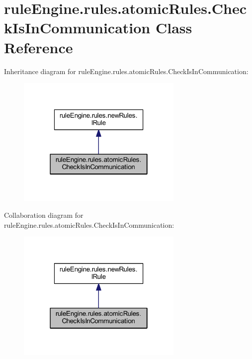 \hypertarget{classrule_engine_1_1rules_1_1atomic_rules_1_1_check_is_in_communication}{}\section{rule\+Engine.\+rules.\+atomic\+Rules.\+Check\+Is\+In\+Communication Class Reference}
\label{classrule_engine_1_1rules_1_1atomic_rules_1_1_check_is_in_communication}


Inheritance diagram for rule\+Engine.\+rules.\+atomic\+Rules.\+Check\+Is\+In\+Communication\+:
\nopagebreak
\begin{figure}[H]
\begin{center}
\leavevmode
\includegraphics[width=226pt]{classrule_engine_1_1rules_1_1atomic_rules_1_1_check_is_in_communication__inherit__graph}
\end{center}
\end{figure}


Collaboration diagram for rule\+Engine.\+rules.\+atomic\+Rules.\+Check\+Is\+In\+Communication\+:
\nopagebreak
\begin{figure}[H]
\begin{center}
\leavevmode
\includegraphics[width=226pt]{classrule_engine_1_1rules_1_1atomic_rules_1_1_check_is_in_communication__coll__graph}
\end{center}
\end{figure}
